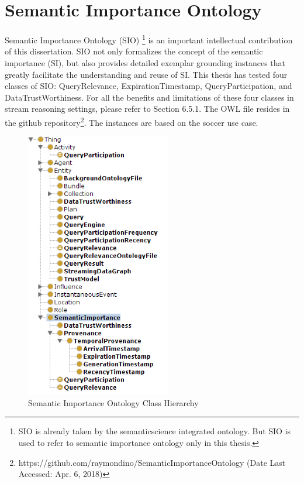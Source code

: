  
\appendix    %

\chapter{Semantic Importance Ontology}
Semantic Importance Ontology (SIO) \footnote{SIO is already taken by the semanticscience integrated ontology. But SIO is used to refer to semantic importance ontology only in this thesis.} is an important intellectual contribution of this dissertation. 
SIO not only formalizes the concept of the semantic importance (SI), but also provides detailed exemplar grounding instances that greatly facilitate the understanding and reuse of SI. 
This thesis has tested four classes of SIO: QueryRelevance, ExpirationTimestamp, QueryParticipation, and DataTrustWorthiness.
For all the benefits and limitations of these four classes in stream reasoning settings, please refer to Section 6.5.1.
The OWL file resides in the github repository\footnote{https://github.com/raymondino/SemanticImportanceOntology (Date Last Accessed: Apr. 6, 2018)}.
The instances are based on the soccer use case.

\begin{figure}[!htbp]
    \centering
    \includegraphics[width=2.5in]{img/app-sio.png}
    \caption{Semantic Importance Ontology Class Hierarchy}
    \label{fig:app-sio}
\end{figure}

